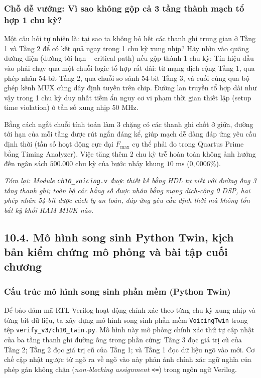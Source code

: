 \subsubsection*{Chỗ dễ vướng: Vì sao không gộp cả 3 tầng thành mạch tổ hợp 1 chu kỳ?}
Một câu hỏi tự nhiên là: tại sao ta không bỏ hết các thanh ghi trung gian ở Tầng 1 và Tầng 2 để có kết quả ngay trong 1 chu kỳ xung nhịp?
Hãy nhìn vào quãng đường điện (đường tới hạn -- critical path) nếu gộp thành 1 chu kỳ:
Tín hiệu đầu vào phải chạy qua một chuỗi logic tổ hợp rất dài: từ mạng dịch-cộng Tầng 1, qua phép nhân 54-bit Tầng 2, qua chuỗi so sánh 54-bit Tầng 3, và cuối cùng qua bộ ghép kênh MUX cùng dây định tuyến trên chip. Đường lan truyền tổ hợp dài như vậy trong 1 chu kỳ duy nhất tiềm ẩn nguy cơ vi phạm thời gian thiết lập (setup time violation) ở tần số xung nhịp $50\text{ MHz}$.

Bằng cách ngắt chuỗi tính toán làm 3 chặng có các thanh ghi chốt ở giữa, đường tới hạn của mỗi tầng được rút ngắn đáng kể, giúp mạch dễ dàng đáp ứng yêu cầu định thời (tần số hoạt động cực đại $F_{\max}$ cụ thể phải đo trong Quartus Prime bằng Timing Analyzer). Việc tăng thêm 2 chu kỳ trễ hoàn toàn không ảnh hưởng đến ngân sách $500.000\text{ chu kỳ}$ của bước nhảy khung $10\text{ ms}$ ($0{,}0006\%$).

\textit{Tóm lại: Module \texttt{ch10\_voicing.v} được thiết kế bằng HDL tự viết với đường ống 3 tầng thanh ghi; toàn bộ các hằng số được nhân bằng mạng dịch-cộng 0 DSP, hai phép nhân 54-bit được cách ly an toàn, đáp ứng yêu cầu định thời mà không tốn bất kỳ khối RAM M10K nào.}

\subsection*{10.4. Mô hình song sinh Python Twin, kịch bản kiểm chứng mô phỏng và bài tập cuối chương}

\subsubsection*{Cấu trúc mô hình song sinh phần mềm (Python Twin)}
Để bảo đảm mã RTL Verilog hoạt động chính xác theo từng chu kỳ xung nhịp và từng bit dữ liệu, ta xây dựng mô hình song sinh phần mềm \texttt{VoicingTwin} trong tệp \texttt{verify\_v3/ch10\_twin.py}. Mô hình này mô phỏng chính xác thứ tự cập nhật của ba tầng thanh ghi đường ống trong phần cứng:
Tầng 3 đọc giá trị cũ của Tầng 2; Tầng 2 đọc giá trị cũ của Tầng 1; và Tầng 1 đọc dữ liệu ngõ vào mới. Cơ chế cập nhật ngược từ ngõ ra về ngõ vào này phản ánh chính xác ngữ nghĩa của phép gán không chặn (\emph{non-blocking assignment} \texttt{<=}) trong ngôn ngữ Verilog.

